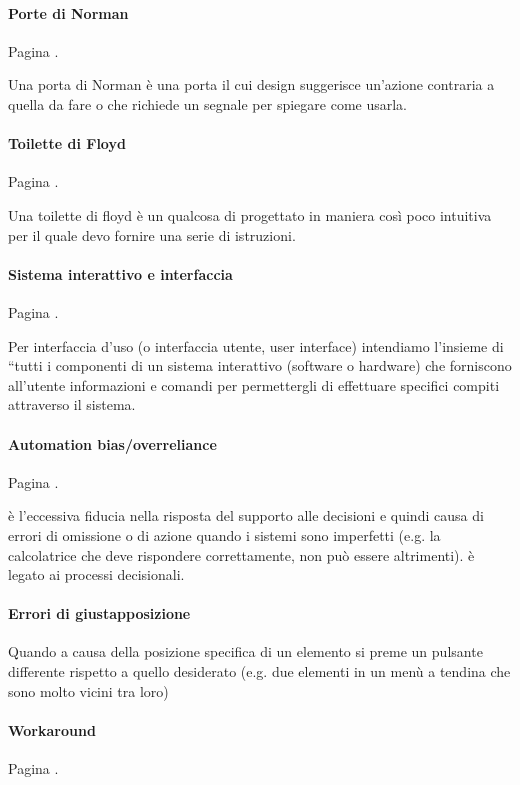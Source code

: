 \documentclass[11pt,a4paper]{book}
\begin{document}
\paragraph{Porte di Norman}
Pagina \pageref{par: porta di norman}.

Una porta di Norman è una porta il cui design suggerisce un'azione contraria a quella da fare o che richiede un segnale per spiegare come usarla.

\paragraph{Toilette di Floyd}
Pagina \pageref{par: toilette di Floyd}.

Una toilette di floyd è un qualcosa di progettato in maniera così poco intuitiva per il quale devo fornire una serie di istruzioni.

\paragraph{Sistema interattivo e interfaccia}
Pagina \pageref{par: sistema interattivo}.

Per interfaccia d'uso (o interfaccia utente, user interface) intendiamo l'insieme di “tutti i componenti di un sistema interattivo (software o hardware) che forniscono all'utente informazioni e comandi per permettergli di effettuare specifici compiti attraverso il sistema.

\paragraph{Automation bias/overreliance}
Pagina \pageref{par: automation bias}.

è l'eccessiva fiducia nella risposta del supporto alle decisioni e quindi causa di errori di omissione o di azione quando i sistemi sono imperfetti (e.g. la calcolatrice che deve rispondere correttamente, non può essere altrimenti). è legato ai processi decisionali.

\paragraph{Errori di giustapposizione}
Quando a causa della posizione specifica di un elemento si preme un pulsante differente rispetto a quello desiderato (e.g. due elementi in un menù a tendina che sono molto vicini tra loro)

\paragraph{Workaround}
Pagina \pageref{par: workaround}.
\end{document}
